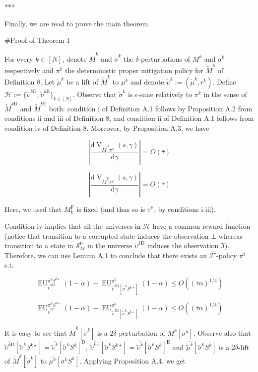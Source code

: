 \documentclass[a4paper]{article}
\newcommand{\AP}[1]{\left(#1\right)}
\newcommand{\AB}[1]{\left[#1\right]}
\newcommand{\D}{\mathrm{d}}
\newcommand{\Abs}[1]{\left\vert #1 \right\vert}
\newcommand{\St}{\mathcal{S}}
\newcommand{\In}{\mathcal{I}}
\newcommand{\Hy}{\mathcal{H}}
\newcommand{\RMD}{\mathrm{D}}
\newcommand{\RME}{\mathrm{E}}
\newcommand{\RMF}{\mathrm{F}}
\newcommand{\SF}{\St^{\RMF}}
\newcommand{\V}{\operatorname{V}}
\newcommand{\EU}{\operatorname{EU}}
\begin{document}
***

Finally, we are read to prove the main theorem.

\#Proof of Theorem 1

For every $k \in [N]$, denote $\tilde{M}^k$ and $\tilde{\sigma}^k$ the $\delta$-perturbations of $M^k$ and $\sigma^k$ respectively and $\pi^k$ the deterministic proper mitigation policy for $\tilde{M}^k$ of Definition 8. Let $\tilde{\mu}^k$ be a lift of $\tilde{M}^k$ to $\mu^k$ and denote $\tilde{\upsilon}^k:=(\tilde{\mu}^k,r^k)$. Define $\Hy:=\{\tilde{\upsilon}^{k\RMD},\tilde{\upsilon}^{k\RME}\}_{k \in [N]}$. Observe that $\tilde{\sigma}^{k}$ is $\epsilon$-sane relatively to $\pi^k$ in the sense of $\tilde{M}^{k\RMD}$ and $\tilde{M}^{k\RME}$ both: condition i of Definition A.1 follows by Proposition A.2 from conditions ii and iii of Definition 8, and condition ii of Definition A.1 follows from condition iv of Definition 8. Moreover, by Proposition A.3, we have

$$\Abs{\frac{\D\V_{\tilde{M}^\RMD\pi^k}(s,\gamma)}{\D\gamma}} = O\AP{\bar{\tau}}$$

$$\Abs{\frac{\D\V_{\tilde{M}^\RME\pi^k}(s,\gamma)}{\D\gamma}} = O\AP{\bar{\tau}}$$

Here, we used that $M^\RMF_k$ is fixed (and thus so is $\bar{\tau}^\RMF$, by conditions i-iii).

Condition iv implies that all the universes in $\Hy$ have a common reward function (notice that transition to a corrupted state induces the observation $\bot$ whereas transition to a state in $\SF_M$ in the universe $\tilde{\upsilon}^{k\RMD}$ induces the observation $\Im$). Therefore, we can use Lemma A.1 to conclude that there exists an $\overline{\In^\star}$-policy $\pi^\sharp$ s.t.

$$\EU_{\tilde{\upsilon}^{k\RMD}}^{\pi^kS^{k\star}}(1-\alpha) - \EU_{\overline{\tilde{\upsilon}^{k\RMD}}\AB{\tilde{\sigma}^k S^{k\star}}}^{\pi^\sharp}(1-\alpha) \leq O\AP{(\bar{\tau} \alpha)^{1/4}}$$

$$\EU_{\tilde{\upsilon}^{k\RME}}^{\pi^kS^{k\star}}(1-\alpha) - \EU_{\overline{\tilde{\upsilon}^{k\RME}}\AB{\tilde{\sigma}^k S^{k\star}}}^{\pi^\sharp}(1-\alpha) \leq O\AP{(\bar{\tau} \alpha)^{1/4}}$$

It is easy to see that $\tilde{M}^k\AB{\tilde{\sigma}^k}$ is a $2\delta$-perturbation of $M^k\AB{\sigma^k}$. Observe also that $\overline{\tilde{\upsilon}^{k\RMD}}\AB{\tilde{\sigma}^k S^{k\star}} = \overline{\tilde{\upsilon}^{k}}\AB{\tilde{\sigma}^k S^{k}}^\RMD$, $\overline{\tilde{\upsilon}^{k\RME}}\AB{\tilde{\sigma}^k S^{k\star}} = \overline{\tilde{\upsilon}^{k}}\AB{\tilde{\sigma}^k S^{k}}^\RME$ and $\overline{\tilde{\mu}^{k}}\AB{\tilde{\sigma}^k S^{k}}$ is a $2\delta$-lift of $\tilde{M}^k\AB{\tilde{\sigma}^k}$ to $\overline{\mu^k}\AB{\sigma^k S^k}$. Applying Proposition A.4, we get
\end{document}
